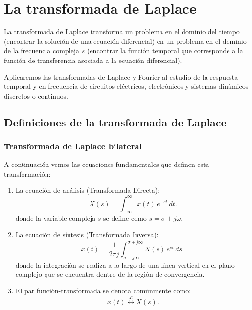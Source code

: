 \chapter{La transformada de Laplace}

La transformada de Laplace transforma un problema en el dominio del tiempo (encontrar la solución de una ecuación diferencial) en un problema en el dominio de la frecuencia compleja $s$ (encontrar la función temporal que corresponde a la función de transferencia asociada a la ecuación diferencial).

Aplicaremos las transformadas de Laplace y Fourier al estudio de la respuesta temporal y en frecuencia de circuitos eléctricos, electrónicos y sistemas dinámicos discretos o continuos.

\section{Definiciones de la transformada de Laplace}

\subsection{Transformada de Laplace bilateral}

A continuación vemos las ecuaciones fundamentales que definen esta transformación:
\begin{enumerate}
	\item La ecuación de análisis (Transformada Directa):
	\begin{equation}
		X(s) = \int_{-\infty}^{\infty} x(t) \, e^{-st} \, dt.
	\end{equation}
	donde la variable compleja $s$ se define como $s = \sigma + j\omega$.
	
	\item La ecuación de síntesis (Transformada Inversa):
	\begin{equation}
		x(t) = \frac{1}{2\pi j} \int_{\sigma - j\infty}^{\sigma + j\infty} X(s) \, e^{st} \, ds,
	\end{equation}
	donde la integración se realiza a lo largo de una línea vertical en el plano complejo que se encuentra dentro de la región de convergencia.
	
	\item El par función-transformada se denota comúnmente como:
	\begin{equation}
		x(t) \stackrel{\mathcal{L}}{\longleftrightarrow} X(s).
	\end{equation}
\end{enumerate}

